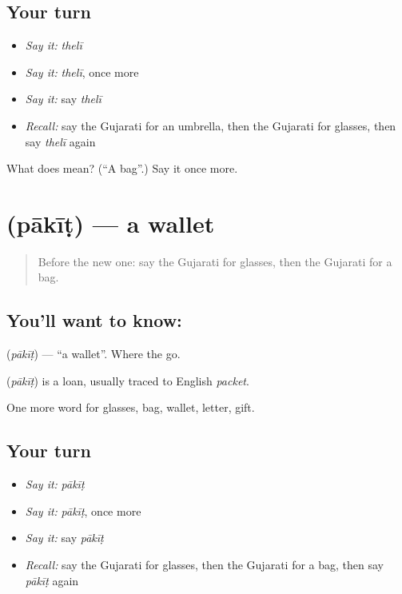 \subsection*{Your turn}
\begin{itemize}
\raggedright
  \item \emph{Say it:} \emph{thelī}
  \item \emph{Say it:} \emph{thelī}, once more
  \item \emph{Say it:} say \emph{thelī}
  \item \emph{Recall:} say the Gujarati for an umbrella, then the Gujarati for glasses, then say \emph{thelī} again
\end{itemize}

\begin{tcolorbox}[breakable,colback=teal!4,colframe=teal!35!black,title={Before you move on}]
What does  mean? (\textquotedblleft{}A bag\textquotedblright{}.) Say it once more.
\end{tcolorbox}
\section[\texorpdfstring{\gu{પાકીટ} (pākīṭ)}{પાકીટ (pākīṭ)}]{ (pākīṭ) — a wallet}

\label{lesson:GU-C88-wallet}



\begin{quote}
Before the new one: say the Gujarati for glasses, then the Gujarati for a bag.
\end{quote}

\subsection*{You'll want to know: }
\textbf{} (\emph{pākīṭ}) — \textquotedblleft{}a wallet\textquotedblright{}. Where the \textbf{} go.

\begin{cousinweb}
\textbf{} (\emph{pākīṭ}) is a loan, usually traced to English \emph{packet}.
\end{cousinweb}

\begin{grammarlens}[title={What you've built}]
One more word for glasses, bag, wallet, letter, gift.
\end{grammarlens}

\subsection*{Your turn}
\begin{itemize}
\raggedright
  \item \emph{Say it:} \emph{pākīṭ}
  \item \emph{Say it:} \emph{pākīṭ}, once more
  \item \emph{Say it:} say \emph{pākīṭ}
  \item \emph{Recall:} say the Gujarati for glasses, then the Gujarati for a bag, then say \emph{pākīṭ} again
\end{itemize}

